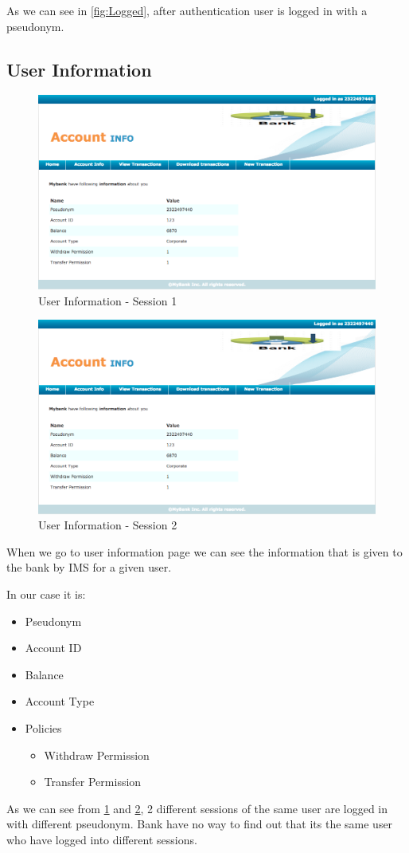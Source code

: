 As we can see in \ref{fig:Logged}, after authentication user is logged in with a pseudonym.	
\subsection{User Information}
\begin{figure}[h]
	\centering
	\includegraphics[width=\textwidth]{figures/Account1}
	\caption{User Information - Session 1}
	\label{fig:Account1}
\end{figure}	
\begin{figure}[h]
	\centering
	\includegraphics[width=\textwidth]{figures/Account1}
	\caption{User Information - Session 2}
	\label{fig:Account2}
\end{figure}
When we go to user information page we can see the information that is given to the bank by IMS for a given user.

In our case it is:
\begin{itemize}
	\item Pseudonym
	\item Account ID
	\item Balance
	\item Account Type
	\item Policies
	\begin{itemize}
		\item Withdraw Permission
		\item Transfer Permission
	\end{itemize}
\end{itemize}
As we can see from \ref{fig:Account1} and \ref{fig:Account2}, 2 different sessions of the same user are logged in with different pseudonym. Bank have no way to find out that its the same user who have logged into different sessions.

